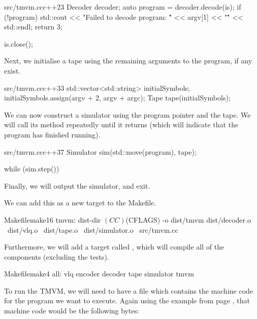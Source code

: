 \begin{file}{src/tmvm.cc}{c++}{23}
    Decoder decoder;
    auto program = decoder.decode(is);
    if (!program)
    {
        std::cout << "Failed to decode program: \"" << argv[1] << "\"" << std::endl;
        return 3;
    }

    is.close();
\end{file}

Next, we initialise a tape using the remaining arguments to the program, if any exist.

\begin{file}{src/tmvm.cc}{c++}{33}
    std::vector<std::string> initialSymbols;
    initialSymbols.assign(argv + 2, argv + argc);
    Tape tape(initialSymbols);
\end{file}

We can now construct a simulator using the program pointer and the tape. We will call its  method repeatedly until it returns  (which will indicate that the program has finished running).

\begin{file}{src/tmvm.cc}{c++}{37}
    Simulator sim(std::move(program), tape);

    while (sim.step())
    {
    }
\end{file}

Finally, we will output the simulator, and exit.

\begin{file}{src/tmvm.cc}{c++}{43}
    std::cout << sim << std::endl;

    return 0;
}
\end{file}

We can add this as a new target to the Makefile.

\begin{file}{Makefile}{make}{16}
tmvm: dist-dir
	$(CC) $(CFLAGS) -o dist/tmvm dist/decoder.o \
	                             dist/vlq.o \
	                             dist/tape.o \
	                             dist/simulator.o \
	                             src/tmvm.cc
\end{file}

Furthermore, we will add a target called , which will compile all of the components (excluding the tests).

\begin{file}{Makefile}{make}{4}
all: vlq encoder decoder tape simulator tmvm
\end{file}

To run the TMVM, we will need to have a file which contains the machine code for the program we want to execute. Again using the example from page \pageref{program:simpleTest}, that machine code would be the following bytes:

